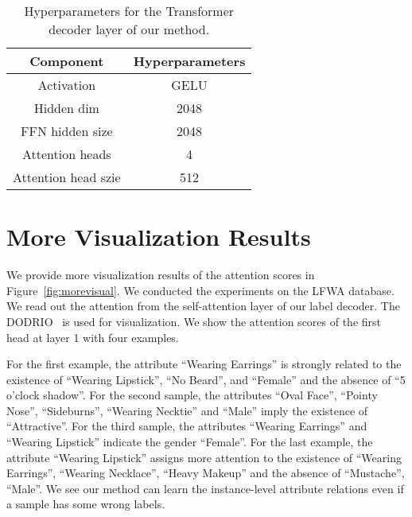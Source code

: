 \documentclass[runningheads]{llncs}
\begin{document}
\begin{table}[htbp]
    \centering
    \renewcommand\tabcolsep{10pt}
    \vspace{5pt}
    \caption{Hyperparameters for the Transformer decoder layer of our method.}
    \label{Hyperparameters}
    \begin{tabular}{cc}
        \toprule[1pt]
        Component & Hyperparameters \\
        \midrule 
        Activation & GELU\\
        Hidden dim & 2048 \\
        FFN hidden size & 2048\\
        Attention heads & 4\\
        Attention head szie & 512 \\
        \bottomrule[1pt]
    \end{tabular}
\end{table}


\section{More Visualization Results}
We provide more visualization results of the attention scores in Figure~\ref{fig:morevisual}. We conducted the experiments on the LFWA database. We read out the attention from the self-attention layer of our label decoder. The DODRIO~\cite{wang2021dodrio} is used for visualization. We show the attention scores of the first head at layer 1 with four examples.

For the first example, the attribute ``Wearing Earrings'' is strongly related to the existence of ``Wearing Lipstick'', ``No Beard'', and ``Female'' and the absence of ``5 o'clock shadow''. For the second sample, the attributes ``Oval Face'', ``Pointy Nose'', ``Sideburns'', ``Wearing Necktie'' and ``Male'' imply the existence of ``Attractive''. For the third sample, the attributes ``Wearing Earrings'' and ``Wearing Lipstick'' indicate the gender ``Female''. For the last example, the attribute ``Wearing Lipstick'' assigns more attention to the existence of ``Wearing Earrings'', ``Wearing Necklace'', ``Heavy Makeup'' and the absence of ``Mustache'', ``Male''.  We see our method can learn the instance-level attribute relations even if a sample has some wrong labels.
\end{document}
